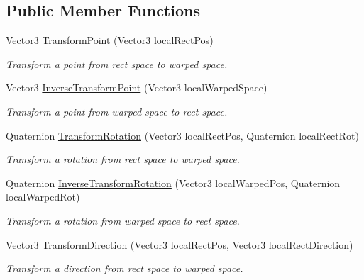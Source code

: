 \subsection*{Public Member Functions}
\begin{DoxyCompactItemize}
\item 
Vector3 \mbox{\hyperlink{interface_leap_1_1_unity_1_1_space_1_1_i_transformer_ad4ffef6002e74fe4967c4b7b9d5a5f74}{Transform\+Point}} (Vector3 local\+Rect\+Pos)
\begin{DoxyCompactList}\small\item\em Transform a point from rect space to warped space. \end{DoxyCompactList}\item 
Vector3 \mbox{\hyperlink{interface_leap_1_1_unity_1_1_space_1_1_i_transformer_ad919653073748169561e99cace4f5931}{Inverse\+Transform\+Point}} (Vector3 local\+Warped\+Space)
\begin{DoxyCompactList}\small\item\em Transform a point from warped space to rect space. \end{DoxyCompactList}\item 
Quaternion \mbox{\hyperlink{interface_leap_1_1_unity_1_1_space_1_1_i_transformer_a69931f79b1e951cf38f1b3855e02ba91}{Transform\+Rotation}} (Vector3 local\+Rect\+Pos, Quaternion local\+Rect\+Rot)
\begin{DoxyCompactList}\small\item\em Transform a rotation from rect space to warped space. \end{DoxyCompactList}\item 
Quaternion \mbox{\hyperlink{interface_leap_1_1_unity_1_1_space_1_1_i_transformer_abfcf877e117b7f70b2ce60259b88c459}{Inverse\+Transform\+Rotation}} (Vector3 local\+Warped\+Pos, Quaternion local\+Warped\+Rot)
\begin{DoxyCompactList}\small\item\em Transform a rotation from warped space to rect space. \end{DoxyCompactList}\item 
Vector3 \mbox{\hyperlink{interface_leap_1_1_unity_1_1_space_1_1_i_transformer_a86883dfa18d51d4254dff56b1d9f5024}{Transform\+Direction}} (Vector3 local\+Rect\+Pos, Vector3 local\+Rect\+Direction)
\begin{DoxyCompactList}\small\item\em Transform a direction from rect space to warped space. \end{DoxyCompactList}\item 

\end{DoxyCompactItemize}
